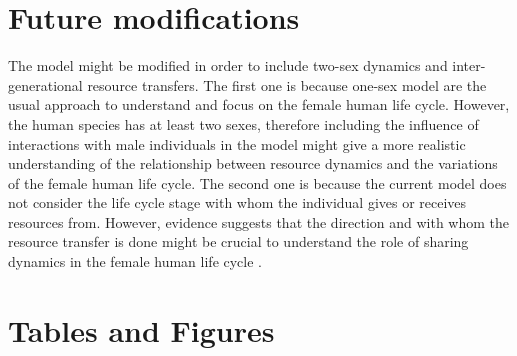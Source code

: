 \documentclass{article}
\begin{document}
\section{Future modifications}

The model might be modified in order to include two-sex dynamics and inter-generational resource transfers. The first one is because one-sex model are the usual approach to understand and focus on the female human life cycle. However, the human species has at least two sexes, therefore including the influence of interactions with male individuals in the model might give a more realistic understanding of the relationship between resource dynamics and the variations of the female human life cycle. The second one is because the current model does not consider the life cycle stage with whom the individual gives or receives resources from. However, evidence suggests that the direction and with whom the resource transfer is done might be crucial to understand the role of sharing dynamics in the female human life cycle \citep{hooper2015inclusive,jones2015resource}.

\section{Tables and Figures}
\end{document}
